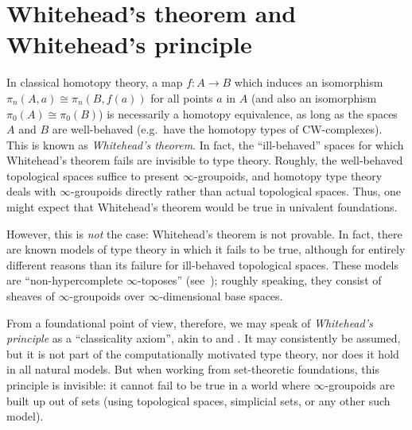 {%

%
%

\section{Whitehead's theorem and Whitehead's principle}
\label{sec:whitehead}

In classical homotopy theory, a map $f:A\to B$ which induces an isomorphism $\pi_n(A,a) \cong \pi_n(B,f(a))$ for all points $a$ in $A$ (and also an isomorphism $\pi_0(A)\cong\pi_0(B)$) is necessarily a homotopy equivalence, as long as the spaces $A$ and $B$ are well-behaved (e.g.\ have the homotopy types of CW-complexes).
%
%
This is known as \emph{Whitehead's theorem}.
In fact, the ``ill-behaved'' spaces for which Whitehead's theorem fails are invisible to type theory.
Roughly, the well-behaved topological spaces suffice to present $\infty$-groupoids,%
and homotopy type theory deals with $\infty$-groupoids directly rather than actual topological spaces.
Thus, one might expect that Whitehead's theorem would be true in univalent foundations.

However, this is \emph{not} the case: Whitehead's theorem is not provable.
In fact, there are known models of type theory in which it fails to be true, although for entirely different reasons than its failure for ill-behaved topological spaces.
These models are ``non-hypercomplete $\infty$-toposes''
%
%
(see~\cite{lurie:higher-topoi}); roughly speaking, they consist of sheaves of $\infty$-groupoids over $\infty$-dimensional base spaces.

%
%

From a foundational point of view, therefore, we may speak of \emph{Whitehead's principle} as a ``classicality axiom'', akin to \LEM{} and \choice{}.
It may consistently be assumed, but it is not part of the computationally motivated type theory, nor does it hold in all natural models.
But when working from set-theoretic foundations, this principle is invisible: it cannot fail to be true in a world where $\infty$-groupoids are built up out of sets (using topological spaces, simplicial sets, or any other such model).

}
